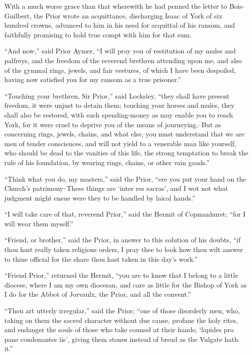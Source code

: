 With a much worse grace than that wherewith he had penned the letter to
Bois-Guilbert, the Prior wrote an acquittance, discharging Isaac of York
of six hundred crowns, advanced to him in his need for acquittal of his
ransom, and faithfully promising to hold true compt with him for that
sum.

``And now,'' said Prior Aymer, ``I will pray you of restitution of my
mules and palfreys, and the freedom of the reverend brethren attending
upon me, and also of the gymmal rings, jewels, and fair vestures, of
which I have been despoiled, having now satisfied you for my ransom as a
true prisoner.''

``Touching your brethren, Sir Prior,'' said Locksley, ``they shall have
present freedom, it were unjust to detain them; touching your horses and
mules, they shall also be restored, with such spending-money as may
enable you to reach York, for it were cruel to deprive you of the means
of journeying.--But as concerning rings, jewels, chains, and what else,
you must understand that we are men of tender consciences, and will not
yield to a venerable man like yourself, who should be dead to the
vanities of this life, the strong temptation to break the rule of his
foundation, by wearing rings, chains, or other vain gauds.''

``Think what you do, my masters,'' said the Prior, ``ere you put your
hand on the Church's patrimony--These things are `inter res sacras', and
I wot not what judgment might ensue were they to be handled by laical
hands.''

``I will take care of that, reverend Prior,'' said the Hermit of
Copmanhurst; ``for I will wear them myself.''

``Friend, or brother,'' said the Prior, in answer to this solution of
his doubts, ``if thou hast really taken religious orders, I pray thee to
look how thou wilt answer to thine official for the share thou hast
taken in this day's work.''

``Friend Prior,'' returned the Hermit, ``you are to know that I belong
to a little diocese, where I am my own diocesan, and care as little for
the Bishop of York as I do for the Abbot of Jorvaulx, the Prior, and all
the convent.''

``Thou art utterly irregular,'' said the Prior; ``one of those
disorderly men, who, taking on them the sacred character without due
cause, profane the holy rites, and endanger the souls of those who take
counsel at their hands; `lapides pro pane condonantes iis', giving them
stones instead of bread as the Vulgate hath it.''

